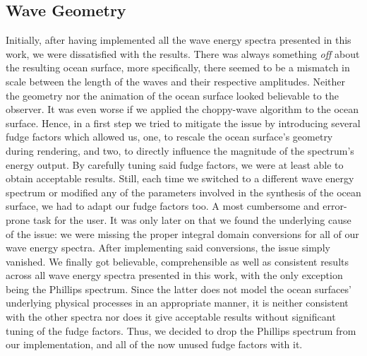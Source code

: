 \subsection{Wave Geometry}
Initially, after having implemented all the wave energy
spectra presented in this work, we were dissatisfied with the results.
There was always something \emph{off} about the resulting ocean surface, more
specifically, there seemed to be a mismatch in scale between the length of the
waves and their respective amplitudes. Neither the geometry nor the animation of
the ocean surface looked believable to the observer. It was even worse if we
applied the choppy-wave algorithm to the ocean surface. Hence, in a first step we
tried to mitigate the issue by introducing several fudge factors which allowed
us, one, to rescale the ocean surface's geometry during rendering, and two,
to directly influence the magnitude of the spectrum's energy output. 
By carefully tuning said fudge factors, we were at least able to obtain
acceptable results. Still, each time we switched to a different wave energy
spectrum or modified any of the parameters involved
in the synthesis of the ocean surface, we had to adapt our fudge factors too.
A most cumbersome and error-prone task for the user.
It was only later on that we found the underlying cause of the issue:
we were missing the proper integral domain conversions for all of our wave energy
spectra. %
After implementing said conversions, the issue simply vanished.
We finally got believable, comprehensible as well as consistent results across
all wave energy spectra presented in this work, with the only exception being
the Phillips spectrum. Since the latter does not model the ocean surfaces'
underlying physical processes in an appropriate manner, it
is neither consistent with the other spectra nor does it give acceptable
results without significant tuning of the fudge factors. Thus, we decided to
drop the Phillips spectrum from our implementation, and all of the now unused
fudge factors with it.
%
